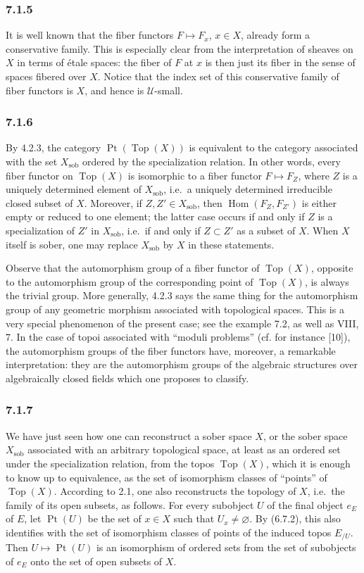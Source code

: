 \documentclass[11pt]{article}
\newcommand{\U}{\mathcal{U}}
\newcommand{\Top}{\operatorname{Top}}
\newcommand{\Pt}{\operatorname{Pt}}
\newcommand{\Hom}{\operatorname{Hom}}
\newcommand{\Ppoint}{\operatorname{Pt}}
\newcommand{\sob}{\operatorname{sob}}
\newcommand{\ie}{i.e.}
\begin{document}
\subsubsection*{7.1.5}
It is well known that the fiber functors \(F\mapsto F_x\), \(x\in X\), already form a conservative family. This is especially clear from the interpretation of sheaves on \(X\) in terms of \'{e}tale spaces: the fiber of \(F\) at \(x\) is then just its fiber in the sense of spaces fibered over \(X\). Notice that the index set of this conservative family of fiber functors is \(X\), and hence is \(\U\)-small.

\subsubsection*{7.1.6}
By 4.2.3, the category \(\Ppoint(\Top(X))\) is equivalent to the category associated with the set \(X_{\sob}\) ordered by the specialization relation. In other words, every fiber functor on \(\Top(X)\) is isomorphic to a fiber functor \(F\mapsto F_Z\), where \(Z\) is a uniquely determined element of \(X_{\sob}\), \ie\ a uniquely determined irreducible closed subset of \(X\). Moreover, if \(Z,Z'\in X_{\sob}\), then \(\Hom(F_Z,F_{Z'})\) is either empty or reduced to one element; the latter case occurs if and only if \(Z\) is a specialization of \(Z'\) in \(X_{\sob}\), \ie\ if and only if \(Z\subset Z'\) as a subset of \(X\). When \(X\) itself is sober, one may replace \(X_{\sob}\) by \(X\) in these statements.

Observe that the automorphism group of a fiber functor of \(\Top(X)\), opposite to the automorphism group of the corresponding point of \(\Top(X)\), is always the trivial group. More generally, 4.2.3 says the same thing for the automorphism group of any geometric morphism associated with topological spaces. This is a very special phenomenon of the present case; see the example 7.2, as well as VIII, 7. In the case of topoi associated with ``moduli problems'' (cf. for instance [10]), the automorphism groups of the fiber functors have, moreover, a remarkable interpretation: they are the automorphism groups of the algebraic structures over algebraically closed fields which one proposes to classify.

\subsubsection*{7.1.7}
We have just seen how one can reconstruct a sober space \(X\), or the sober space \(X_{\sob}\) associated with an arbitrary topological space, at least as an ordered set under the specialization relation, from the topos \(\Top(X)\), which it is enough to know up to equivalence, as the set of isomorphism classes of ``points'' of \(\Top(X)\). According to 2.1, one also reconstructs the topology of \(X\), \ie\ the family of its open subsets, as follows. For every subobject \(U\) of the final object \(e_E\) of \(E\), let \(\Pt(U)\) be the set of \(x\in X\) such that \(U_x\ne\varnothing\). By (6.7.2), this also identifies with the set of isomorphism classes of points of the induced topos \(E_{/U}\). Then \(U\mapsto\Pt(U)\) is an isomorphism of ordered sets from the set of subobjects of \(e_E\) onto the set of open subsets of \(X\).
\end{document}
